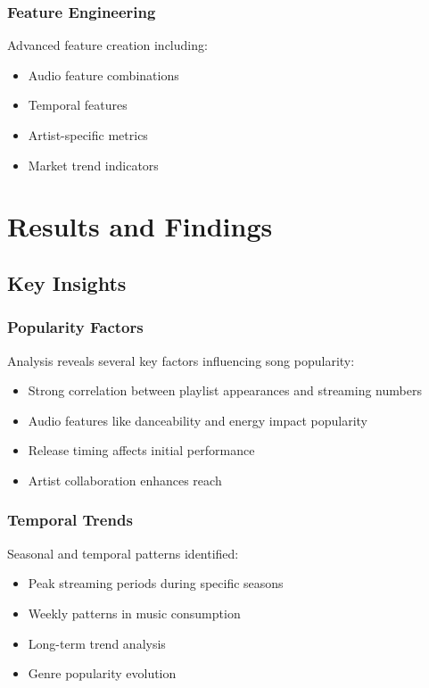 \documentclass[12pt,a4paper]{article}
\begin{document}
\subsubsection{Feature Engineering}
Advanced feature creation including:
\begin{itemize}
    \item Audio feature combinations
    \item Temporal features
    \item Artist-specific metrics
    \item Market trend indicators
\end{itemize}

\section{Results and Findings}

\subsection{Key Insights}
\subsubsection{Popularity Factors}
Analysis reveals several key factors influencing song popularity:
\begin{itemize}
    \item Strong correlation between playlist appearances and streaming numbers
    \item Audio features like danceability and energy impact popularity
    \item Release timing affects initial performance
    \item Artist collaboration enhances reach
\end{itemize}

\subsubsection{Temporal Trends}
Seasonal and temporal patterns identified:
\begin{itemize}
    \item Peak streaming periods during specific seasons
    \item Weekly patterns in music consumption
    \item Long-term trend analysis
    \item Genre popularity evolution
\end{itemize}
\end{document}
